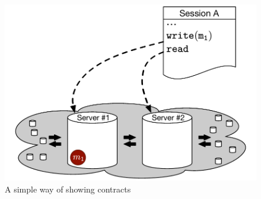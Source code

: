 \begin{figure}[h]
\includegraphics[scale=0.48]{../Figures/System_example.pdf}
\caption{A simple way of showing contracts}
\label{fig:ctrt}
\end{figure}


